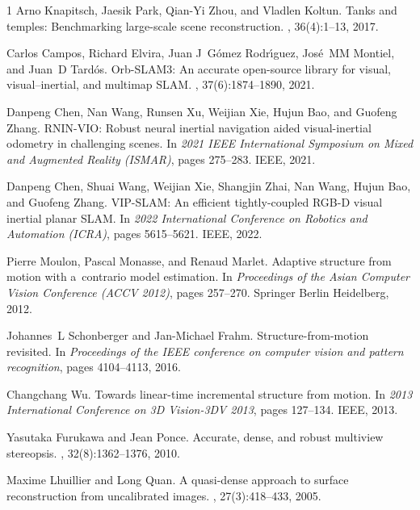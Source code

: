 \begin{thebibliography}{1}
Arno Knapitsch, Jaesik Park, Qian-Yi Zhou, and Vladlen Koltun.
\newblock Tanks and temples: Benchmarking large-scale scene reconstruction.
, 36(4):1--13, 2017.

Carlos Campos, Richard Elvira, Juan J~G{\'o}mez Rodr{\'\i}guez, Jos{\'e}~MM Montiel, and Juan~D Tard{\'o}s.
\newblock Orb-SLAM3: An accurate open-source library for visual, visual--inertial, and multimap SLAM.
, 37(6):1874--1890, 2021.

Danpeng Chen, Nan Wang, Runsen Xu, Weijian Xie, Hujun Bao, and Guofeng Zhang.
\newblock RNIN-VIO: Robust neural inertial navigation aided visual-inertial odometry in challenging scenes.
\newblock In {\em 2021 IEEE International Symposium on Mixed and Augmented Reality (ISMAR)}, pages 275--283. IEEE, 2021.

Danpeng Chen, Shuai Wang, Weijian Xie, Shangjin Zhai, Nan Wang, Hujun Bao, and Guofeng Zhang.
\newblock VIP-SLAM: An efficient tightly-coupled RGB-D visual inertial planar SLAM.
\newblock In {\em 2022 International Conference on Robotics and Automation (ICRA)}, pages 5615--5621. IEEE, 2022.

Pierre Moulon, Pascal Monasse, and Renaud Marlet.
\newblock Adaptive structure from motion with a~contrario model estimation.
\newblock In {\em Proceedings of the Asian Computer Vision Conference (ACCV 2012)}, pages 257--270. Springer Berlin Heidelberg, 2012.

Johannes~L Schonberger and Jan-Michael Frahm.
\newblock Structure-from-motion revisited.
\newblock In {\em Proceedings of the IEEE conference on computer vision and pattern recognition}, pages 4104--4113, 2016.

Changchang Wu.
\newblock Towards linear-time incremental structure from motion.
\newblock In {\em 2013 International Conference on 3D Vision-3DV 2013}, pages 127--134. IEEE, 2013.

Yasutaka Furukawa and Jean Ponce.
\newblock Accurate, dense, and robust multiview stereopsis.
, 32(8):1362--1376, 2010.

Maxime Lhuillier and Long Quan.
\newblock A quasi-dense approach to surface reconstruction from uncalibrated images.
, 27(3):418--433, 2005.


\end{thebibliography}
